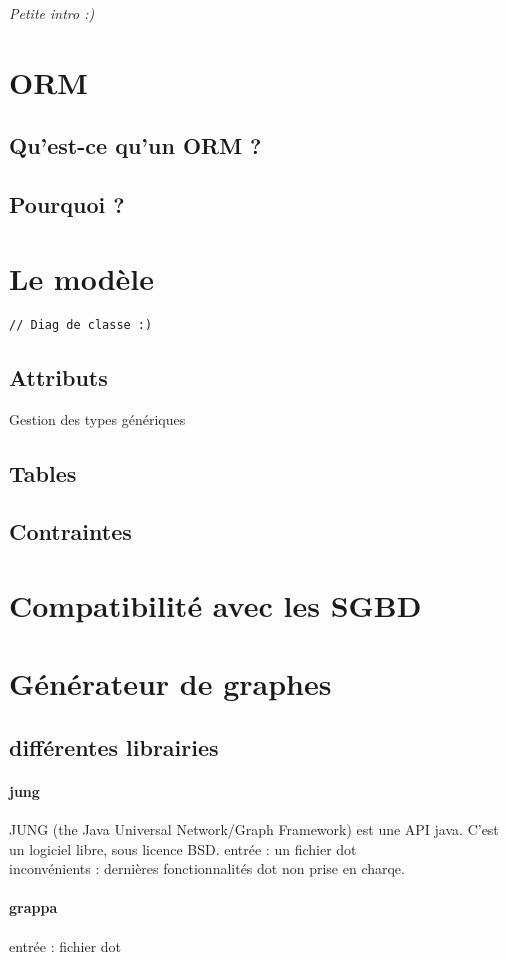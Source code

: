 \textit{Petite intro :)}

\section{ORM}
\subsection{Qu'est-ce qu'un ORM ?}
\subsection{Pourquoi ?}

\section{Le modèle}
	\verb+// Diag de classe :)+
	\subsection{Attributs}
		Gestion des types génériques
	\subsection{Tables}
	\subsection{Contraintes}

\section{Compatibilité avec les SGBD}

\section{Générateur de graphes}
  \subsection{différentes librairies}
		\paragraph{jung}
				JUNG (the Java Universal Network/Graph Framework) est une API java. C'est un logiciel libre, sous licence BSD.
				entrée : un fichier dot\\
				inconvénients : dernières fonctionnalités dot non prise en charqe.
		\paragraph{grappa}
				 entrée : fichier dot
